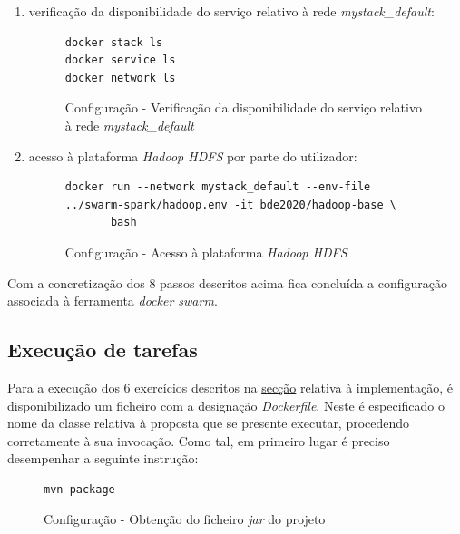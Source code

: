 \documentclass[a4paper]{report}
\begin{document}
{\begin{enumerate}[label=\textbf{\arabic*.}]
                \item verificação da disponibilidade do serviço relativo à rede \textit{mystack\_default}:
                \begin{figure}[H]
                    \centering
                    \begin{verbatim}
docker stack ls
docker service ls
docker network ls
                    \end{verbatim}
                    \vspace{-5mm}
                    \caption{Configuração - Verificação da disponibilidade do serviço relativo à rede \textit{mystack\_default}}
                    \label{fig:12}
                \end{figure}

                \item acesso à plataforma \textit{Hadoop HDFS} por parte do utilizador:
                \begin{figure}[H]
                    \centering
                    \begin{verbatim}
docker run --network mystack_default --env-file ../swarm-spark/hadoop.env -it bde2020/hadoop-base \
       bash
                    \end{verbatim}
                    \vspace{-5mm}
                    \caption{Configuração - Acesso à plataforma \textit{Hadoop HDFS}}
                    \label{fig:13}
                \end{figure}
            \end{enumerate}}

            Com a concretização dos 8 passos descritos acima fica concluída a configuração associada à ferramenta \textit{docker swarm}.
        
        \subsection{Execução de tarefas} \label{subsec:Configuration-Dockerfile}
        Para a execução dos 6 exercícios descritos na \hyperref[ch:Implementation]{secção} relativa à implementação, é disponibilizado um ficheiro com a designação \textit{Dockerfile}.
        Neste é especificado o nome da classe relativa à proposta que se presente executar, procedendo corretamente à sua invocação.
        Como tal, em primeiro lugar é preciso desempenhar a seguinte instrução:
        \begin{figure}[H]
            \centering
            \begin{verbatim}
mvn package
            \end{verbatim}
            \vspace{-5mm}
            \caption{Configuração - Obtenção do ficheiro \textit{jar} do projeto}
            \label{fig:14}
        \end{figure}
        
\end{document}
